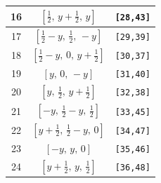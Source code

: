 \documentclass[fleqn,8pt]{jsarticle}
\begin{document}
\begin{longtable}{ccc}
16 & $\left[ \frac{1}{2},\, y + \frac{1}{2},\, y \right]$ & {\tt [28,43]} \\ \hline
17 & $\left[ \frac{1}{2} - y,\, \frac{1}{2},\, - y \right]$ & {\tt [29,39]} \\ \hline
18 & $\left[ \frac{1}{2} - y,\, 0,\, y + \frac{1}{2} \right]$ & {\tt [30,37]} \\ \hline
19 & $\left[ y,\, 0,\, - y \right]$ & {\tt [31,40]} \\ \hline
20 & $\left[ y,\, \frac{1}{2},\, y + \frac{1}{2} \right]$ & {\tt [32,38]} \\ \hline
21 & $\left[ - y,\, \frac{1}{2} - y,\, \frac{1}{2} \right]$ & {\tt [33,45]} \\ \hline
22 & $\left[ y + \frac{1}{2},\, \frac{1}{2} - y,\, 0 \right]$ & {\tt [34,47]} \\ \hline
23 & $\left[ - y,\, y,\, 0 \right]$ & {\tt [35,46]} \\ \hline
24 & $\left[ y + \frac{1}{2},\, y,\, \frac{1}{2} \right]$ & {\tt [36,48]} \\
\end{longtable}
\renewcommand{\arraystretch}{1.2}
\end{document}
